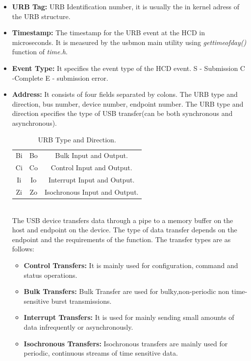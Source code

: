 \begin{itemize}
\item {\textbf{URB Tag:} URB Identification number, it is usually the in kernel adress of the URB structure.}
\item{\textbf{Timestamp:} The timestamp for the URB event at the HCD in microseconds. It is measured by the usbmon main utility using \textit{gettimeofday()} function of \textit{time.h}.}
\item{\textbf{Event Type:} It specifies the event type of the HCD event. S - Submission C -Complete E - submission error.}
\item{\textbf{Address: } It consists of four fields separated by colons. The URB type and direction, bus number, device number, endpoint number. The URB type and direction specifies the type of USB transfer(can be both synchronous and asynchronous).\\
\begin{table}[h!]
\centering
\begin{tabular}{|c|c|c|}
\hline
Bi & Bo & Bulk Input and Output.\\
Ci & Co & Control Input and Output.\\
Ii & Io & Interrupt Input and Output.\\
Zi & Zo & Isochronous Input and Output.\\
\hline
\end{tabular}
\caption{URB Type and Direction.}
\end{table}\\
The USB device transfers data through a pipe to a memory buffer on the host and endpoint on the device. The type of data transfer depends on the endpoint and the requirements of the function. The transfer types are as follows\cite{_usb_data_transfer}:

\begin{itemize}
\item{\textbf{Control Transfers:} It is mainly used for configuration, command and status operations.}
\item{\textbf{Bulk Transfers:} Bulk Transfer are used for bulky,non-periodic non time-sensitive burst transmissions.}
\item{\textbf{Interrupt Transfers:} It is used for mainly sending small amounts of data infrequently or asynchronously.}
\item{\textbf{Isochronous Transfers:} Isochronous transfers are mainly used for periodic, continuous streams of time sensitive data.} 
\end{itemize}
}


\end{itemize}
